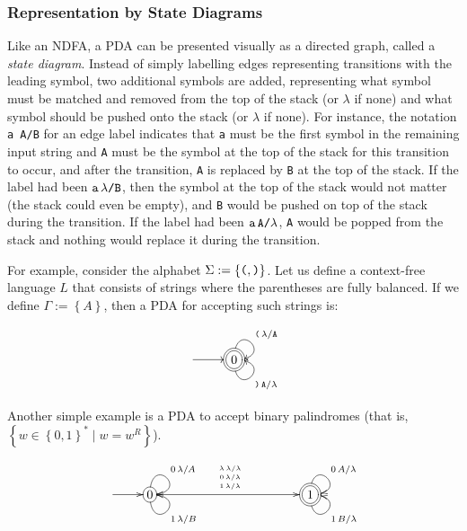 \documentclass[12pt]{article}
\begin{document}
\subsubsection*{Representation by State Diagrams}

Like an NDFA, a PDA can be presented visually as a directed graph, called a \emph{state diagram}.  Instead of simply labelling edges representing transitions with the leading symbol, two additional symbols are added, representing what symbol must be matched and removed from the top of the stack (or $\lambda$ if none) and what symbol should be pushed onto the stack (or $\lambda$ if none).  For instance, the notation
\verb=a A/B= for an edge label indicates that \verb=a= must be the first symbol in the remaining input string and \verb=A= must be the symbol at the top of the stack for this transition to occur, and after the transition, \verb=A= is replaced by \verb=B= at the top of the stack.  If the label had been
$\verb=a=\,\lambda\verb=/B=$, then the symbol at the top of the stack would not matter (the stack could even be empty), and \verb=B= would be pushed on top of the stack during the transition.  If the label had been $\verb=a=\,\verb=A/=\lambda$, \verb=A= would be popped from the stack and nothing would replace it during the transition.

For example, consider the alphabet $\Sigma := \left\{ \verb=(=, \verb=)= \right\}$.
Let us define a context-free language $L$ that consists of strings where the parentheses are fully balanced.  If we define $\Gamma := \left\{ A \right\}$,
then a PDA for accepting such strings is:

$$
\UseComputerModernTips
\xymatrix {
\ar[r] &
*++[o][F=]{0}
\ar@(u,r)[]^{\texttt{(}\,\lambda/\texttt{A}}
\ar@(d,r)[]_{\texttt{)}\,\texttt{A}/\lambda}
}
$$

Another simple example is a PDA to accept binary palindromes
(that is, $\left\{ w \in \left\{ 0, 1 \right\}^* \mid w = w^R \right\}$).

$$
\xymatrix{
\ar[r] &
*+[o][F-]{0}
\ar@(u,r)[]^{0\,\lambda/A}
\ar@(d,r)[]_{1\,\lambda/B}
\ar[rrrr]^{\stackrel{\lambda\,\lambda/\lambda}{\stackrel{0\,\lambda/\lambda}{\stackrel{1\,\lambda/\lambda}{}}}}
&&&&
*++[o][F=]{1}
\ar@(u,r)[]^{0\,A/\lambda}
\ar@(d,r)[]_{1\,B/\lambda}
}
$$
\end{document}

